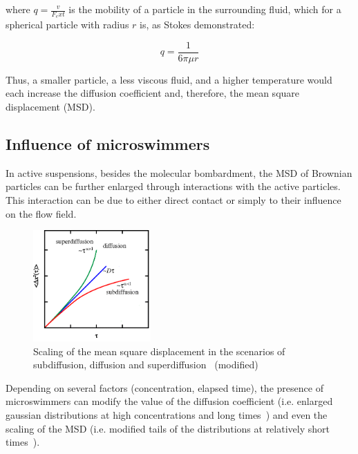 where $q = \frac{v}{F_ext}$ is the mobility of a particle in the surrounding fluid, which for a spherical particle with radius $r$ is, as Stokes demonstrated: 

\begin{equation}
q=\frac{1}{6 \pi \mu r}
\end{equation}

Thus, a smaller particle, a less viscous fluid, and a higher temperature would each increase the diffusion coefficient and, therefore, the mean square displacement (MSD). 

\subsection{Influence of microswimmers}

In active suspensions, besides the molecular bombardment, the MSD of Brownian particles can be further enlarged through interactions with the active particles. This interaction can be due to either direct contact or simply to their influence on the flow field.

\begin{figure}[H]
	\centering
	\includegraphics[width=0.4\textwidth]{archivos/SubSuperDif.png}
	\caption{Scaling of the mean square displacement in the scenarios of subdiffusion, diffusion and superdiffusion~\cite{MacKintosh7138} (modified)}
	\label{SSDif}
\end{figure}

Depending on several factors (concentration, elapsed time), the presence of microswimmers can modify the value of the diffusion coefficient (i.e. enlarged gaussian distributions at high concentrations and long times~\cite{Kurtuldu2011}) and even the scaling of the MSD (i.e. modified tails of the distributions at relatively short times~\cite{Kurtuldu2011}). 